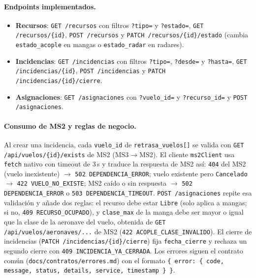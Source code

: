 \paragraph{Endpoints implementados.}
\begin{itemize}
  \item \textbf{Recursos}: \texttt{GET /recursos} con filtros
    \texttt{?tipo=} y \texttt{?estado=}, \texttt{GET /recursos/\{id\}},
    \texttt{POST /recursos} y \texttt{PATCH /recursos/\{id\}/estado}
    (cambia \texttt{estado\_acople} en mangas o \texttt{estado\_radar}
    en radares).
  \item \textbf{Incidencias}: \texttt{GET /incidencias} con filtros
    \texttt{?tipo=}, \texttt{?desde=} y \texttt{?hasta=},
    \texttt{GET /incidencias/\{id\}}, \texttt{POST /incidencias} y
    \texttt{PATCH /incidencias/\{id\}/cierre}.
  \item \textbf{Asignaciones}: \texttt{GET /asignaciones} con
    \texttt{?vuelo\_id=} y \texttt{?recurso\_id=} y
    \texttt{POST /asignaciones}.
\end{itemize}

\paragraph{Consumo de MS2 y reglas de negocio.}
Al crear una incidencia, cada \texttt{vuelo\_id} de
\texttt{retrasa\_vuelos[]} se valida con
\texttt{GET /api/vuelos/\{id\}/exists} de MS2 (MS3$\to$MS2). El cliente
\texttt{ms2Client} usa \texttt{fetch} nativo con timeout de 3\,s y
traduce la respuesta de MS2 así: \texttt{404} del MS2 (vuelo inexistente)
$\to$ \texttt{502 DEPENDENCIA\_ERROR}; vuelo existente pero
\texttt{Cancelado} $\to$ \texttt{422 VUELO\_NO\_EXISTE}; MS2 caído o sin
respuesta $\to$ \texttt{502 DEPENDENCIA\_ERROR} o
\texttt{503 DEPENDENCIA\_TIMEOUT}. \texttt{POST /asignaciones} repite esa
validación y añade dos reglas: el recurso debe estar \texttt{Libre}
(solo aplica a mangas; si no, \texttt{409 RECURSO\_OCUPADO}), y
\texttt{clase\_max} de la manga debe ser mayor o igual que la clase de
la aeronave del vuelo, obtenida de \texttt{GET /api/vuelos/aeronaves/...}
de MS2 (\texttt{422 ACOPLE\_CLASE\_INVALIDO}). El cierre de incidencias
(\texttt{PATCH /incidencias/\{id\}/cierre}) fija \texttt{fecha\_cierre}
y rechaza un segundo cierre con \texttt{409 INCIDENCIA\_YA\_CERRADA}.
Los errores siguen el contrato común (\texttt{docs/contratos/errores.md})
con el formato \texttt{\{ error: \{ code, message, status, details,
service, timestamp \} \}}.

